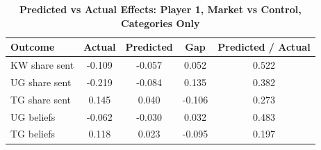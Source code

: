 \begin{table}[!htbp]
\centering
\caption{\textbf{Predicted vs Actual Effects: Player 1, Market vs Control, Categories Only}}
\label{tab:cats_only_market_vs_control_fullpooled_p1_fit}
\begin{tabular}{lcccc}
\toprule
Outcome & Actual & Predicted & Gap & Predicted / Actual \\
\midrule
KW share sent & -0.109 & -0.057 & 0.052 & 0.522 \\
UG share sent & -0.219 & -0.084 & 0.135 & 0.382 \\
TG share sent & 0.145 & 0.040 & -0.106 & 0.273 \\
UG beliefs & -0.062 & -0.030 & 0.032 & 0.483 \\
TG beliefs & 0.118 & 0.023 & -0.095 & 0.197 \\
\bottomrule
\end{tabular}
\end{table}
